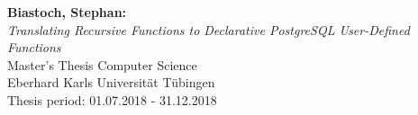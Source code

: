 \documentclass[oneside,12pt,a4paper]{report}
\begin{document}

\thispagestyle{empty}
\vspace*{\fill}
\begin{minipage}{11.2cm}
\textbf{Biastoch, Stephan:}\\
\emph{Translating Recursive Functions to Declarative PostgreSQL User-Defined Functions}\\ Master's Thesis Computer Science\\
Eberhard Karls Universität Tübingen\\
Thesis period: 01.07.2018 - 31.12.2018
\end{minipage}
\newpage


\setcounter{page}{1}





%
\newpage


\renewcommand{\baselinestretch}{1.3}
\small\normalsize

\tableofcontents

\renewcommand{\baselinestretch}{1}
\small\normalsize

\cleardoublepage






\end{document}
